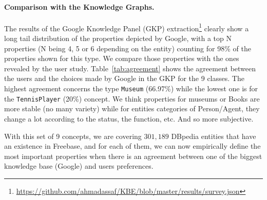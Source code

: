 \documentclass[runningheads,a4paper]{llncs}
\begin{document}
\paragraph{\textbf{Comparison with the Knowledge Graphs.}}
\label{sec:comparison}
The results of the Google Knowledge Panel (GKP) extraction\footnote{\url{https://github.com/ahmadassaf/KBE/blob/master/results/survey.json}} clearly show a long tail distribution of the properties depicted by Google, with a top N properties (N being 4, 5 or 6 depending on the entity) counting for 98\% of the properties shown for this type. We compare those properties with the ones revealed by the user study. Table~\ref{tab:agreement} shows the agreement between the users and the choices made by Google in the GKP for the 9 classes. The highest agreement concerns the type \texttt{Museum} (66.97\%) while the lowest one is for the \texttt{TennisPlayer} (20\%) concept. We think properties for museums or Books are more stable (no many variety) while for entities categories of Person/Agent, they change a lot according to the status, the function, etc. And so more subjective. 

\begin{table}[!htp]
\end{table}\normalsize
With this set of 9 concepts, we are covering $301,189$ DBpedia entities that have an existence in Freebase, and for each of them, we can now empirically define the most important properties when there is an agreement between one of the biggest knowledge base (Google) and users preferences.
\end{document}
